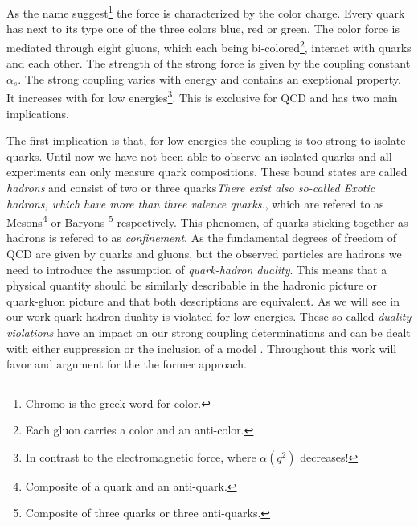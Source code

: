 \documentclass[../../index.tex]{subfiles}
\begin{document}
As the name suggest\footnote{Chromo is the greek word for color.} the
force is characterized by the color charge. Every quark has next to its type one
of the three colors blue, red or green. The color force is mediated through
eight gluons, which each being bi-colored\footnote{Each gluon carries a color
  and an anti-color.}, interact with quarks and each other. The strength of the
strong force is given by the coupling constant $\alpha_s$. The strong coupling
varies with energy and contains an exeptional property. It increases with for
low energies\footnote{In contrast to the electromagnetic force, where $\alpha(q^2)$
  decreases!}. This is exclusive for QCD and has two main implications.

The first implication is that, for low energies the coupling is too strong to
isolate quarks. Until now we have not been able to observe an isolated quarks
and all experiments can only measure quark compositions. These bound states are
called \textit{hadrons} and consist of two or three quarks\textit{There exist
  also so-called \textit{Exotic hadrons}, which have more than three valence
  quarks.}, which are refered to as Mesons\footnote{Composite of a quark and an
  anti-quark.} or Baryons \footnote{Composite of three quarks or three
  anti-quarks.} respectively. This
phenomen, of quarks sticking together as hadrons is refered to as \textit{confinement}. 
As the fundamental degrees of freedom of QCD are given by quarks and gluons, but
the observed particles are hadrons we need to introduce the assumption of
\textit{quark-hadron duality}. This means that a physical quantity should be
similarly describable in the hadronic picture or quark-gluon picture and that
both descriptions are equivalent. As we will see in our work quark-hadron
duality is violated for low energies. These so-called \textit{duality
  violations} have an impact on our strong coupling determinations and can be
dealt with either suppression or the inclusion of a model \cite{}. Throughout
this work will favor and argument for the the former approach.
\end{document}
